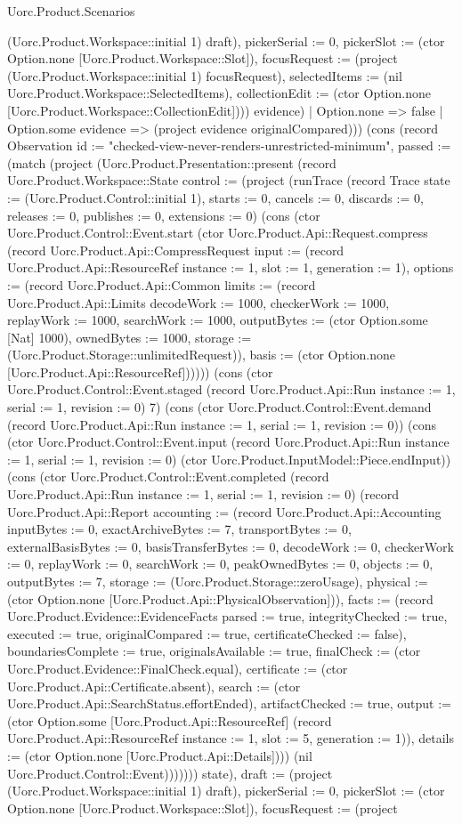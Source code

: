 \begin{lexlean}{Uorc.Product.Scenarios}
\begin{semanticmodule}
{{(Uorc.Product.Workspace::initial 1) draft), pickerSerial := 0, pickerSlot := (ctor Option.none [Uorc.Product.Workspace::Slot]), focusRequest := (project (Uorc.Product.Workspace::initial 1) focusRequest), selectedItems := (nil Uorc.Product.Workspace::SelectedItems), collectionEdit := (ctor Option.none [Uorc.Product.Workspace::CollectionEdit])})) evidence)
    | Option.none => false
    | Option.some evidence => (project evidence originalCompared))}) (cons (record Observation {id := "checked-view-never-renders-unrestricted-minimum", passed := (match (project (Uorc.Product.Presentation::present (record Uorc.Product.Workspace::State {control := (project (runTrace (record Trace {state := (Uorc.Product.Control::initial 1), starts := 0, cancels := 0, discards := 0, releases := 0, publishes := 0, extensions := 0}) (cons (ctor Uorc.Product.Control::Event.start (ctor Uorc.Product.Api::Request.compress (record Uorc.Product.Api::CompressRequest {input := (record Uorc.Product.Api::ResourceRef {instance := 1, slot := 1, generation := 1}), options := (record Uorc.Product.Api::Common {limits := (record Uorc.Product.Api::Limits {decodeWork := 1000, checkerWork := 1000, replayWork := 1000, searchWork := 1000, outputBytes := (ctor Option.some [Nat] 1000), ownedBytes := 1000, storage := (Uorc.Product.Storage::unlimitedRequest)}), basis := (ctor Option.none [Uorc.Product.Api::ResourceRef])})}))) (cons (ctor Uorc.Product.Control::Event.staged (record Uorc.Product.Api::Run {instance := 1, serial := 1, revision := 0}) 7) (cons (ctor Uorc.Product.Control::Event.demand (record Uorc.Product.Api::Run {instance := 1, serial := 1, revision := 0})) (cons (ctor Uorc.Product.Control::Event.input (record Uorc.Product.Api::Run {instance := 1, serial := 1, revision := 0}) (ctor Uorc.Product.InputModel::Piece.endInput)) (cons (ctor Uorc.Product.Control::Event.completed (record Uorc.Product.Api::Run {instance := 1, serial := 1, revision := 0}) (record Uorc.Product.Api::Report {accounting := (record Uorc.Product.Api::Accounting {inputBytes := 0, exactArchiveBytes := 7, transportBytes := 0, externalBasisBytes := 0, basisTransferBytes := 0, decodeWork := 0, checkerWork := 0, replayWork := 0, searchWork := 0, peakOwnedBytes := 0, objects := 0, outputBytes := 7, storage := (Uorc.Product.Storage::zeroUsage), physical := (ctor Option.none [Uorc.Product.Api::PhysicalObservation])}), facts := (record Uorc.Product.Evidence::EvidenceFacts {parsed := true, integrityChecked := true, executed := true, originalCompared := true, certificateChecked := false}), boundariesComplete := true, originalsAvailable := true, finalCheck := (ctor Uorc.Product.Evidence::FinalCheck.equal), certificate := (ctor Uorc.Product.Api::Certificate.absent), search := (ctor Uorc.Product.Api::SearchStatus.effortEnded), artifactChecked := true, output := (ctor Option.some [Uorc.Product.Api::ResourceRef] (record Uorc.Product.Api::ResourceRef {instance := 1, slot := 5, generation := 1})), details := (ctor Option.none [Uorc.Product.Api::Details])})) (nil Uorc.Product.Control::Event))))))) state), draft := (project (Uorc.Product.Workspace::initial 1) draft), pickerSerial := 0, pickerSlot := (ctor Option.none [Uorc.Product.Workspace::Slot]), focusRequest := (project }}
\end{semanticmodule}
\end{lexlean}
